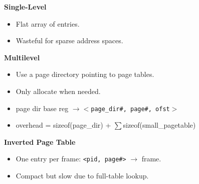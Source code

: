 \documentclass[8pt,twocolumn]{article}
\begin{document}
\vspace{-0.6em}
\textbf{Single-Level}
\vspace{-0.6em}
\begin{itemize}
    \setlength{\itemsep}{0pt} %
    \setlength{\parskip}{0pt}
  \item Flat array of entries.
  \item Wasteful for sparse address spaces.
\end{itemize}
\vspace{-0.6em}
\textbf{Multilevel}
\vspace{-0.6em}
\begin{itemize}
    \setlength{\itemsep}{0pt} %
    \setlength{\parskip}{0pt}
  \item Use a page directory pointing to page tables.
  \item Only allocate when needed.
  \item page dir base reg \texttt{$\rightarrow<$page\_dir\#, page\#, ofst$>$}
  \item overhead = sizeof(page\_dir) + $\sum$sizeof(small\_pagetable)
\end{itemize}
\vspace{-0.6em}
\textbf{Inverted Page Table}
\vspace{-0.6em}
\begin{itemize}
    \setlength{\itemsep}{0pt} %
    \setlength{\parskip}{0pt}
  \item One entry per frame: \texttt{<pid, page\#>} $\rightarrow$ frame.
  \item Compact but slow due to full-table lookup.
\end{itemize}
\vspace{-1.6em}
\begin{table}[h!]
    \centering
    \renewcommand{\arraystretch}{0.8}
    \end{table}
\end{document}
